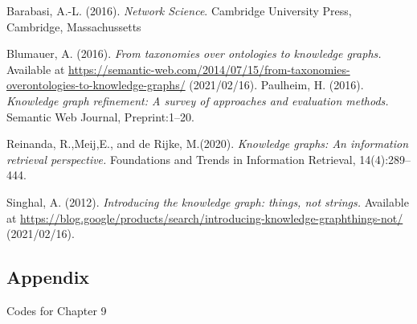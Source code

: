 \documentclass[
]{article}
\begin{document}
Barabasi, A.-L. (2016). \emph{Network Science}. Cambridge University Press, Cambridge, Massachussetts

Blumauer, A. (2016). \emph{From taxonomies over ontologies to knowledge graphs.} Available at \url{https://semantic-web.com/2014/07/15/from-taxonomies-overontologies-to-knowledge-graphs/} (2021/02/16).
Paulheim, H. (2016). \emph{Knowledge graph refinement: A survey of approaches and evaluation methods.} Semantic Web Journal, Preprint:1--20.

Reinanda, R.,Meij,E., and de Rijke, M.(2020). \emph{Knowledge graphs: An information retrieval perspective.} Foundations and Trends in Information Retrieval, 14(4):289--444.

Singhal, A. (2012). \emph{Introducing the knowledge graph: things, not strings.} Available at \url{https://blog.google/products/search/introducing-knowledge-graphthings-not/} (2021/02/16).

\newpage

\hypertarget{appendix-1}{%
\subsection*{Appendix}\label{appendix-1}}

Codes for Chapter 9

\scriptsize
\end{document}
